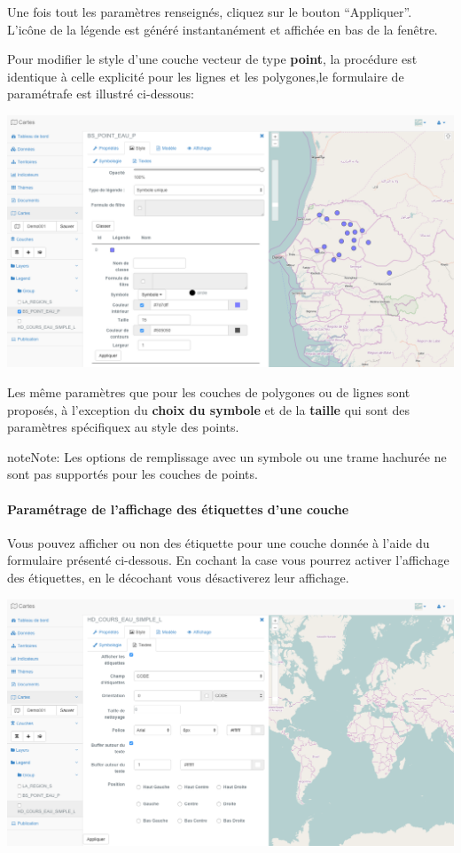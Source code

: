 \documentclass[letterpaper,10pt,french]{sphinxmanual}
\begin{document}
Une fois tout les paramètres renseignés, cliquez sur le bouton ``Appliquer''. L'icône de la légende est généré instantanément et affichée en bas de la fenêtre.

Pour modifier le style d'une couche vecteur de type \textbf{point}, la
procédure est identique à celle explicité pour les lignes et les
polygones,le formulaire de paramétrafe est illustré ci-dessous:

\includegraphics[width=1.000\linewidth]{set-symbol-window.png}

Les même paramètres que pour les couches de polygones ou de lignes sont proposés, à l'exception du \textbf{choix du symbole} et de la \textbf{taille} qui sont des paramètres spécifiquex au style des points.

\begin{notice}{note}{Note:}
Les options de remplissage avec un symbole ou une trame hachurée ne sont pas supportés pour les couches de points.
\end{notice}


\paragraph{Paramétrage de l'affichage des étiquettes d'une couche}
\label{maps/layerstree:parametrage-de-l-affichage-des-etiquettes-d-une-couche}
Vous pouvez afficher ou non des étiquette pour une couche donnée à
l'aide du formulaire présenté ci-dessous. En cochant la case vous
pourrez activer l'affichage des étiquettes, en le décochant vous
désactiverez leur affichage.

\includegraphics[width=1.000\linewidth]{set-layer-labels.png}
\end{document}
